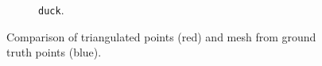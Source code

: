 \documentclass[12pt,letterpaper]{article} %
\begin{document}
\begin{figure}[p]
\begin{subfigure}[b]{0.35\linewidth}
        \caption{\texttt{duck}.}\label{fig:reconstruct-e}
    \end{subfigure}
    \hfill\hspace{0pt}
    \caption{Comparison of triangulated points (red) and mesh from ground truth points (blue).}\label{fig:reconstructed-mesh}
\end{figure}

%
\end{document}
